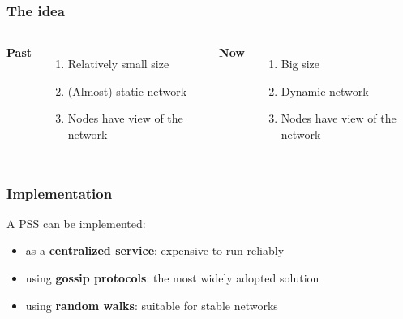 \documentclass{beamer}
\begin{document}
\begin{frame}
\frametitle{The idea}
\begin{columns}[t] %

\textbf{Past}
\begin{enumerate}
\item Relatively small size
\item (Almost) static network
\item Nodes have {\color{red}{full}} view of the network
\end{enumerate}

\textbf{Now}
\begin{enumerate}
\item Big size
\item Dynamic network
\item Nodes have {\color{red}{partial}} view of the network
\end{enumerate}
\end{columns}\end{frame}


\begin{frame}
\frametitle{Implementation}
A PSS can be implemented:
\begin{itemize}
	\item as a \textbf{centralized service}: expensive to run reliably
	\item using \textbf{gossip protocols}: the most widely adopted solution
	\item using \textbf{random walks}: suitable for stable networks
\end{itemize}
\end{frame}
\end{document}
